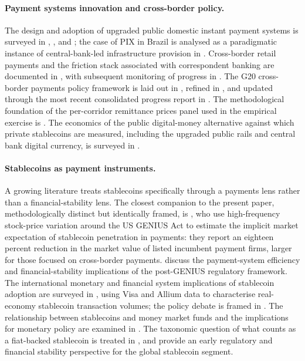 \paragraph{Payment systems innovation and cross-border policy.} The design and adoption of upgraded public domestic instant payment systems is surveyed in \citet{bech_shimizu_wong_2017}, \citet{boar_etal_2020}, and \citet{frost_etal_2024_fast_payments}; the case of PIX in Brazil is analysed as a paradigmatic instance of central-bank-led infrastructure provision in \citet{duarte_etal_2022_pix}. Cross-border retail payments and the friction stack associated with correspondent banking are documented in \citet{cpmi_2018_cross_border_retail}, with subsequent monitoring of progress in \citet{cpmi_brief10_2024}. The G20 cross-border payments policy framework is laid out in \citet{fsb_2020_roadmap}, refined in \citet{fsb_2023_priority_actions}, and updated through the most recent consolidated progress report in \citet{fsb_2025_progress}. The methodological foundation of the per-corridor remittance prices panel used in the empirical exercise is \citet{beck_martinez_peria_2011}. The economics of the public digital-money alternative against which private stablecoins are measured, including the upgraded public rails and central bank digital currency, is surveyed in \citet{ahnert_etal_2024_economics_cbdc}.

\paragraph{Stablecoins as payment instruments.} A growing literature treats stablecoins specifically through a payments lens rather than a financial-stability lens. The closest companion to the present paper, methodologically distinct but identically framed, is \citet{copestake_etal_2026}, who use high-frequency stock-price variation around the US GENIUS Act to estimate the implicit market expectation of stablecoin penetration in payments: they report an eighteen percent reduction in the market value of listed incumbent payment firms, larger for those focused on cross-border payments. \citet{ahmed_clouse_etal_2025} discuss the payment-system efficiency and financial-stability implications of the post-GENIUS regulatory framework. The international monetary and financial system implications of stablecoin adoption are surveyed in \citet{aldasoro_frost_ito_2026}, using Visa and Allium data to characterise real-economy stablecoin transaction volumes; the policy debate is framed in \citet{hernandez_de_cos_2026}. The relationship between stablecoins and money market funds and the implications for monetary policy are examined in \citet{bis_wp_1219}. The taxonomic question of what counts as a fiat-backed stablecoin is treated in \citet{bis_papers_141}, and \citet{adachi_etal_2020} provide an early regulatory and financial stability perspective for the global stablecoin segment.

